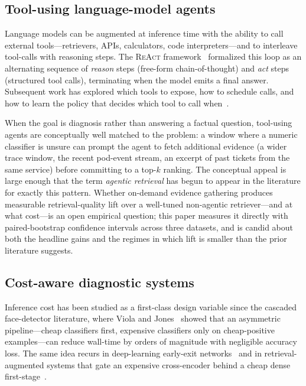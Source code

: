 \subsection{Tool-using language-model agents}
\label{sec:background:agents}

Language models can be augmented at inference time with the ability to call external tools---retrievers, APIs, calculators, code interpreters---and to interleave tool-calls with reasoning steps. The \textsc{ReAct} framework~\cite{yao2023react} formalized this loop as an alternating sequence of \emph{reason} steps (free-form chain-of-thought) and \emph{act} steps (structured tool calls), terminating when the model emits a final answer. Subsequent work has explored which tools to expose, how to schedule calls, and how to learn the policy that decides which tool to call when~\cite{schick2023toolformer,lewis2020rag,izacard2023atlas}.

When the goal is diagnosis rather than answering a factual question, tool-using agents are conceptually well matched to the problem: a window where a numeric classifier is unsure can prompt the agent to fetch additional evidence (a wider trace window, the recent pod-event stream, an excerpt of past tickets from the same service) before committing to a top-$k$ ranking. The conceptual appeal is large enough that the term \emph{agentic retrieval} has begun to appear in the literature for exactly this pattern. Whether on-demand evidence gathering produces measurable retrieval-quality lift over a well-tuned non-agentic retriever---and at what cost---is an open empirical question; this paper measures it directly with paired-bootstrap confidence intervals across three datasets, and is candid about both the headline gains and the regimes in which lift is smaller than the prior literature suggests.

\subsection{Cost-aware diagnostic systems}
\label{sec:background:cost}

Inference cost has been studied as a first-class design variable since the cascaded face-detector literature, where Viola and Jones~\cite{viola2001cascade} showed that an asymmetric pipeline---cheap classifiers first, expensive classifiers only on cheap-positive examples---can reduce wall-time by orders of magnitude with negligible accuracy loss. The same idea recurs in deep-learning early-exit networks~\cite{teerapittayanon2016branchynet} and in retrieval-augmented systems that gate an expensive cross-encoder behind a cheap dense first-stage~\cite{nogueira2019rerank}.

